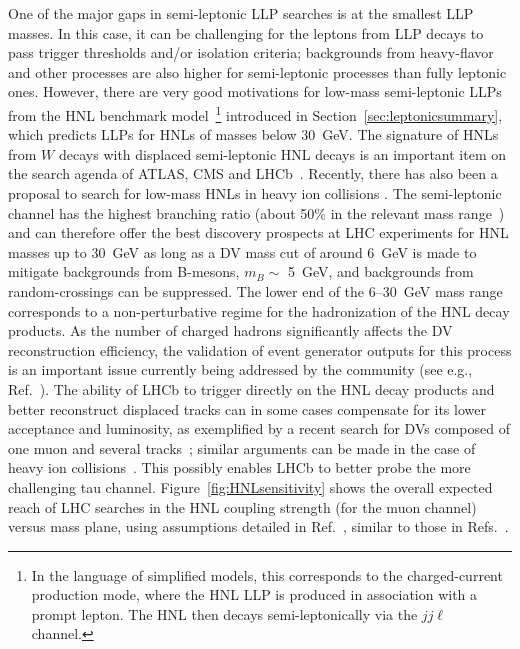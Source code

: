 One of the major gaps in semi-leptonic LLP searches is at the smallest LLP masses. In this case, it can be challenging for the leptons from LLP decays to pass trigger thresholds and/or isolation criteria; backgrounds from heavy-flavor and other processes are also higher for semi-leptonic processes than fully leptonic ones. However, there are very good motivations for low-mass semi-leptonic LLPs from the HNL benchmark model~\footnote{In the language of simplified models, this corresponds to the charged-current production mode, where the HNL LLP is produced in association with a prompt lepton. The HNL then decays semi-leptonically via the $jj\ell$ channel.} introduced in Section~\ref{sec:leptonicsummary}, which predicts LLPs for HNLs of masses below 30~GeV. The signature of HNLs from $W$ decays with displaced semi-leptonic HNL decays is an important item on the search agenda of ATLAS, CMS and LHCb~\cite{Helo:2013esa,Izaguirre:2015pga,Mermod2017,Antusch2017,Nemevsek:2018bbt,Cottin:2018kmq}. Recently, there has also been a proposal to search for low-mass HNLs in heavy ion collisions \cite{Drewes:2018xma}. The semi-leptonic channel has the highest branching ratio (about 50\% in the relevant mass range~\cite{Gronau1984}) and can therefore offer the best discovery prospects at LHC experiments for HNL masses up to 30~GeV as long as a DV mass cut of around 6~GeV is made to mitigate backgrounds from B-mesons, $m_B \sim$ 5~GeV, and backgrounds from random-crossings can be suppressed. The lower end of the 6--30~GeV mass range corresponds to a non-perturbative regime for the hadronization of the HNL decay products. As the number of charged hadrons significantly affects the DV reconstruction efficiency, the validation of event generator outputs for this process is an important issue currently being addressed by the community (see e.g., Ref.~\cite{Cottin:2018kmq}). The ability of LHCb to trigger directly on the HNL decay products and better reconstruct displaced tracks can in some cases compensate for its lower acceptance and luminosity, as exemplified by a recent search for DVs composed of one muon and several tracks~\cite{Aaij:2016xmb,Antusch2017}; similar arguments can be made in the case of heavy ion collisions~\cite{Drewes:2018xma}. This possibly enables LHCb to better probe the more challenging tau channel. Figure~\ref{fig:HNLsensitivity} shows the overall expected reach of LHC searches in the HNL coupling strength (for the muon channel) versus mass plane, using assumptions detailed in Ref.~\cite{Mermod2017}, similar to those in Refs.~\cite{Helo:2013esa,Izaguirre:2015pga}.

